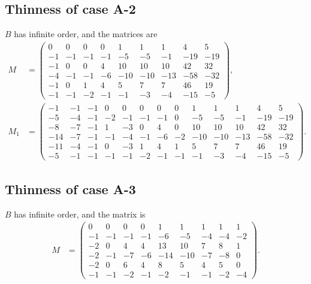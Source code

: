 \documentclass[11pt,a4paper]{amsart}
\theoremstyle{definition}
\theoremstyle{definition}
\numberwithin{equation}{section}
\begin{document}
\subsection{Thinness of case A-2}
$B$ has infinite order, and the matrices are
\begin{align*}
M & =\left(\begin{array}{rrrrrrrrr}
0 & 0 & 0 & 0 & 1 & 1 & 1 & 4 & 5 \\
-1 & -1 & -1 & -1 & -5 & -5 & -1 & -19 & -19 \\
-1 & 0 & 0 & 4 & 10 & 10 & 10 & 42 & 32 \\
-4 & -1 & -1 & -6 & -10 & -10 & -13 & -58 & -32 \\
-1 & 0 & 1 & 4 & 5 & 7 & 7 & 46 & 19 \\
-1 & -1 & -2 & -1 & -1 & -3 & -4 & -15 & -5
\end{array}\right),\\
M_{1} & =\left(\begin{array}{rrrrrrrrrrrrr}
-1 & -1 & -1 & 0 & 0 & 0 & 0 & 0 & 1 & 1 & 1 & 4 & 5 \\
-5 & -4 & -1 & -2 & -1 & -1 & -1 & 0 & -5 & -5 & -1 & -19 & -19 \\
-8 & -7 & -1 & 1 & -3 & 0 & 4 & 0 & 10 & 10 & 10 & 42 & 32 \\
-14 & -7 & -1 & -1 & -4 & -1 & -6 & -2 & -10 & -10 & -13 & -58 & -32 \\
-11 & -4 & -1 & 0 & -3 & 1 & 4 & 1 & 5 & 7 & 7 & 46 & 19 \\
-5 & -1 & -1 & -1 & -1 & -2 & -1 & -1 & -1 & -3 & -4 & -15 & -5
\end{array}\right).
\end{align*}

\subsection{Thinness of case A-3}
$B$ has infinite order, and the matrix is
\begin{align*}
M & =\left(\begin{array}{rrrrrrrrr}
0 & 0 & 0 & 0 & 1 & 1 & 1 & 1 & 1 \\
-1 & -1 & -1 & -1 & -6 & -5 & -4 & -4 & -2 \\
-2 & 0 & 4 & 4 & 13 & 10 & 7 & 8 & 1 \\
-2 & -1 & -7 & -6 & -14 & -10 & -7 & -8 & 0 \\
-2 & 0 & 6 & 4 & 8 & 5 & 4 & 5 & 0 \\
-1 & -1 & -2 & -1 & -2 & -1 & -1 & -2 & -4
\end{array}\right).
\end{align*}
\end{document}
